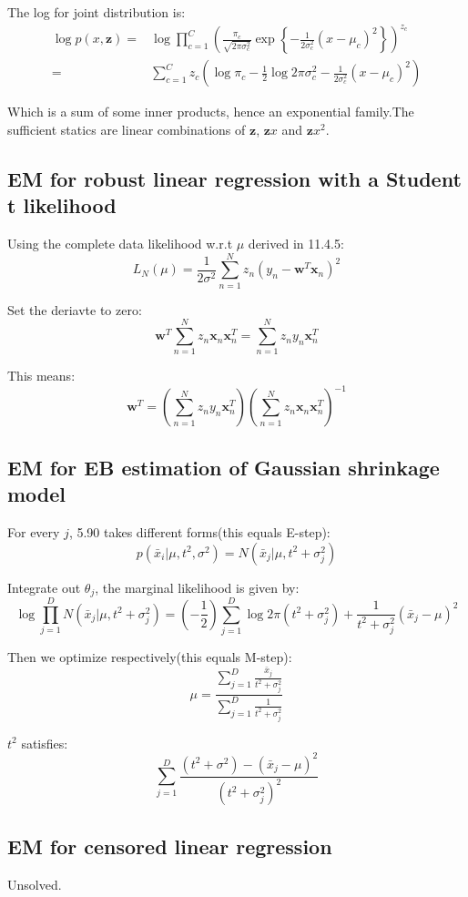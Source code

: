 \documentclass[UTF8]{ctexart}
\begin{document}
The log for joint distribution is:
\begin{align}
\log p(x,\textbf{z})=&\log \prod_{c=1}^{C}(\frac{\pi_{c}}{\sqrt{2\pi \sigma_{c}^{2}}}\exp\left\{ -\frac{1}{2\sigma_{c}^{2}}(x-\mu_{c})^{2} \right\})^{z_{c}}\nonumber \\
=&\sum_{c=1}^{C}z_{c}(\log \pi_{c} -\frac{1}{2}\log 2\pi \sigma_{c}^{2} - \frac{1}{2\sigma_{c}^{2}}(x-\mu_{c})^{2})\nonumber
\end{align}

Which is a sum of some inner products, hence an exponential family.The sufficient statics are linear combinations of $\textbf{z}$, $\textbf{z}x$ and $\textbf{z}x^{2}$.

\subsection{EM for robust linear regression with a Student t likelihood}
Using the complete data likelihood w.r.t $\mu$ derived in 11.4.5:
$$L_{N}(\mu)=\frac{1}{2\sigma^{2}} \sum_{n=1}^{N}z_{n}(y_{n}-\textbf{w}^{T}\textbf{x}_{n})^{2}$$

Set the deriavte to zero:
$$\textbf{w}^{T}\sum_{n=1}^{N}z_{n}\textbf{x}_{n}\textbf{x}_{n}^{T}=\sum_{n=1}^{N}z_{n}y_{n}\textbf{x}_{n}^{T}$$

This means:
$$\textbf{w}^{T}=(\sum_{n=1}^{N}z_{n}y_{n}\textbf{x}_{n}^{T})(\sum_{n=1}^{N}z_{n}\textbf{x}_{n}\textbf{x}_{n}^{T})^{-1}$$


\subsection{EM for EB estimation of Gaussian shrinkage model}
For every $j$, 5.90 takes different forms(this equals E-step):
$$p(\bar{x}_{i}|\mu,t^{2},\sigma^{2})=N(\bar{x}_{j}|\mu,t^{2}+\sigma^{2}_{j})$$

Integrate out $\theta_{j}$, the marginal likelihood is given by:
$$\log \prod_{j=1}^{D}N(\bar{x}_{j}|\mu,t^{2}+\sigma^{2}_{j}) = (-\frac{1}{2})\sum_{j=1}^{D}\log 2\pi(t^{2}+\sigma_{j}^{2})+\frac{1}{t^{2}+\sigma_{j}^{2}}(\bar{x}_{j}-\mu)^{2}$$

Then we optimize respectively(this equals M-step):
$$\mu=\frac{\sum_{j=1}^{D}\frac{\bar{x}_{j}}{t^{2}+\sigma_{j}^{2}}}{\sum_{j=1}^{D}\frac{1}{t^{2}+\sigma_{j}^{2}}}$$

$t^{2}$ satisfies:
$$\sum_{j=1}^{D}\frac{(t^{2}+\sigma^{2})-(\bar{x}_{j}-\mu)^{2}}{(t^{2}+\sigma_{j}^{2})^{2}}$$

\subsection{EM for censored linear regression}
Unsolved.
\end{document}
